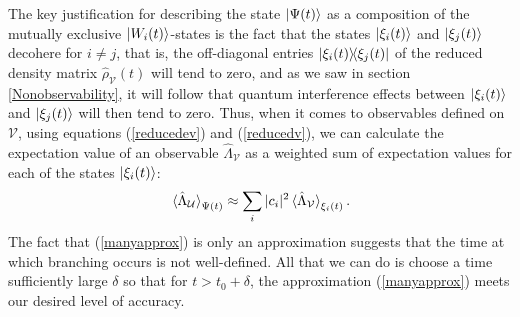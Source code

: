 \documentclass[letter, 12pt]{turabian-thesis}
\theoremstyle{hypothesis}
\begin{document}
The key justification for describing the state $\ket{\Psi(t)}$ as a composition of the mutually exclusive $\ket{W_i(t)}$-states is the fact that the states $\ket{\xi_i(t)}$ and $\ket{\xi_j(t)}$ decohere for $i\neq j$, that is, the off-diagonal entries $\dyad{\xi_i(t)}{\xi_j(t)}$ of the reduced density matrix $\hat{\rho}_\mathcal{V}(t)$ will tend to zero, and as we saw in section \ref{Nonobservability}, it will follow that quantum interference effects between $\ket{\xi_i(t)}$ and $\ket{\xi_j(t)}$ will then tend to zero. Thus, when it comes to observables defined on $\mathcal{V}$, using equations (\ref{reducedev}) and (\ref{reducedv}), we can calculate the expectation value of an observable $\hat{\Lambda}_\mathcal{V}$  as a weighted sum of expectation values for each of the states $\ket{\xi_i(t)}$:
\begin{equation}\label{manyapprox}\ev*{\hat{\Lambda}_\mathcal{U}}_{\Psi(t)}\approx\sum_i |c_i|^2 \ev*{\hat{\Lambda}_\mathcal{V}}_{\xi_i(t)}.\end{equation}
The fact that (\ref{manyapprox}) is only an approximation suggests that the time at which branching occurs is not well-defined. All that we can do is choose a time sufficiently large $\delta$ so that for  $t>t_0+\delta$, the approximation (\ref{manyapprox}) meets our desired level of accuracy. 
\end{document}
